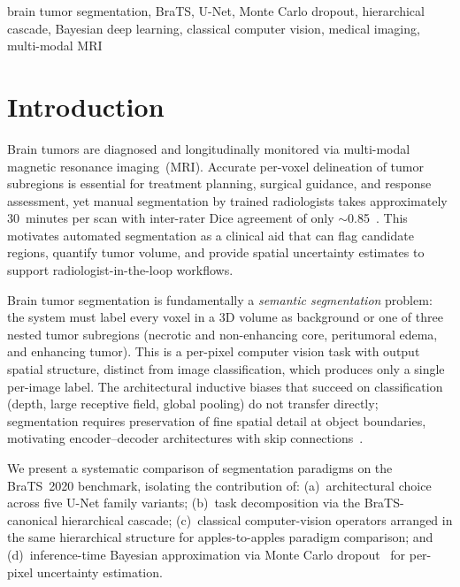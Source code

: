 \documentclass[conference]{IEEEtran}
\begin{document}
\begin{IEEEkeywords}
brain tumor segmentation, BraTS, U-Net, Monte Carlo dropout,
hierarchical cascade, Bayesian deep learning, classical computer vision,
medical imaging, multi-modal MRI
\end{IEEEkeywords}

\section{Introduction}


Brain tumors are diagnosed and longitudinally monitored via multi-modal
magnetic resonance imaging~(MRI). Accurate per-voxel delineation of
tumor subregions is essential for treatment planning, surgical guidance,
and response assessment, yet manual segmentation by trained radiologists
takes approximately 30~minutes per scan with inter-rater Dice agreement
of only $\sim$0.85~\cite{bakas2018brats,menze2014brats}. This motivates
automated segmentation as a clinical aid that can flag candidate
regions, quantify tumor volume, and provide spatial uncertainty estimates
to support radiologist-in-the-loop workflows.

Brain tumor segmentation is fundamentally a \emph{semantic segmentation}
problem: the system must label every voxel in a 3D volume as background
or one of three nested tumor subregions (necrotic and non-enhancing
core, peritumoral edema, and enhancing tumor). This is a per-pixel
computer vision task with output spatial structure, distinct from image
classification, which produces only a single per-image label. The
architectural inductive biases that succeed on classification (depth,
large receptive field, global pooling) do not transfer directly;
segmentation requires preservation of fine spatial detail at object
boundaries, motivating encoder--decoder architectures with skip
connections~\cite{ronneberger2015unet}.

We present a systematic comparison of segmentation paradigms on the
BraTS~2020 benchmark, isolating the contribution of: (a)~architectural
choice across five U-Net family variants; (b)~task decomposition via
the BraTS-canonical hierarchical cascade; (c)~classical computer-vision
operators arranged in the same hierarchical structure for apples-to-apples
paradigm comparison; and (d)~inference-time Bayesian approximation via
Monte Carlo dropout~\cite{gal2016dropout} for per-pixel uncertainty
estimation.
\end{document}
